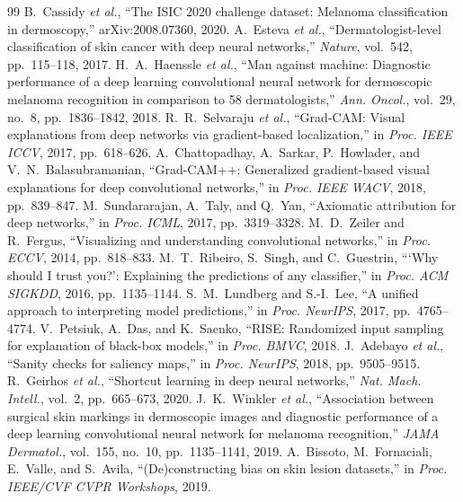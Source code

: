\documentclass[journal]{IEEEtran}
\begin{document}
\begin{thebibliography}{99}
 B.~Cassidy \textit{et al.}, ``The ISIC 2020 challenge dataset: Melanoma classification in dermoscopy,'' arXiv:2008.07360, 2020.
 A.~Esteva \textit{et al.}, ``Dermatologist-level classification of skin cancer with deep neural networks,'' \textit{Nature}, vol.~542, pp.~115--118, 2017.
 H.~A.~Haenssle \textit{et al.}, ``Man against machine: Diagnostic performance of a deep learning convolutional neural network for dermoscopic melanoma recognition in comparison to 58 dermatologists,'' \textit{Ann. Oncol.}, vol.~29, no.~8, pp.~1836--1842, 2018.
 R.~R.~Selvaraju \textit{et al.}, ``Grad-CAM: Visual explanations from deep networks via gradient-based localization,'' in \textit{Proc. IEEE ICCV}, 2017, pp.~618--626.
 A.~Chattopadhay, A.~Sarkar, P.~Howlader, and V.~N.~Balasubramanian, ``Grad-CAM++: Generalized gradient-based visual explanations for deep convolutional networks,'' in \textit{Proc. IEEE WACV}, 2018, pp.~839--847.
 M.~Sundararajan, A.~Taly, and Q.~Yan, ``Axiomatic attribution for deep networks,'' in \textit{Proc. ICML}, 2017, pp.~3319--3328.
 M.~D.~Zeiler and R.~Fergus, ``Visualizing and understanding convolutional networks,'' in \textit{Proc. ECCV}, 2014, pp.~818--833.
 M.~T.~Ribeiro, S.~Singh, and C.~Guestrin, ```Why should I trust you?': Explaining the predictions of any classifier,'' in \textit{Proc. ACM SIGKDD}, 2016, pp.~1135--1144.
 S.~M.~Lundberg and S.-I.~Lee, ``A unified approach to interpreting model predictions,'' in \textit{Proc. NeurIPS}, 2017, pp.~4765--4774.
 V.~Petsiuk, A.~Das, and K.~Saenko, ``RISE: Randomized input sampling for explanation of black-box models,'' in \textit{Proc. BMVC}, 2018.
 J.~Adebayo \textit{et al.}, ``Sanity checks for saliency maps,'' in \textit{Proc. NeurIPS}, 2018, pp.~9505--9515.
 R.~Geirhos \textit{et al.}, ``Shortcut learning in deep neural networks,'' \textit{Nat. Mach. Intell.}, vol.~2, pp.~665--673, 2020.
 J.~K.~Winkler \textit{et al.}, ``Association between surgical skin markings in dermoscopic images and diagnostic performance of a deep learning convolutional neural network for melanoma recognition,'' \textit{JAMA Dermatol.}, vol.~155, no.~10, pp.~1135--1141, 2019.
 A.~Bissoto, M.~Fornaciali, E.~Valle, and S.~Avila, ``(De)constructing bias on skin lesion datasets,'' in \textit{Proc. IEEE/CVF CVPR Workshops}, 2019.

\end{thebibliography}
\end{document}
